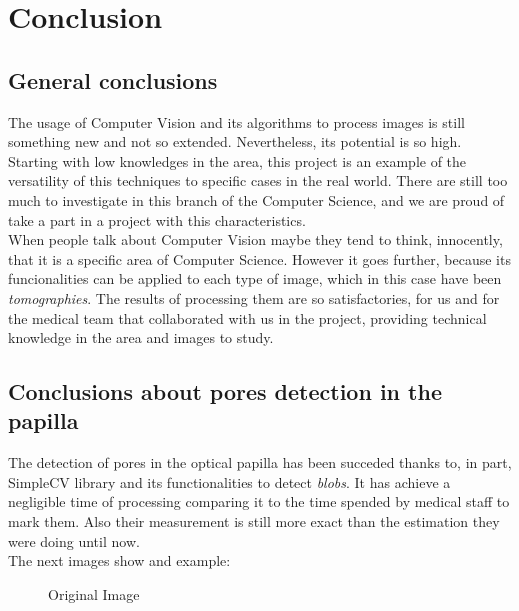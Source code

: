 \chapter{Conclusion}
\section{General conclusions}
The usage of Computer Vision and its algorithms to process images is
still something new and not so extended. Nevertheless, its potential is
so high. Starting with low knowledges in the area, this project is an
example of the versatility of this techniques to specific cases in
the real world. There are still too much to investigate in this branch
of the Computer Science, and we are proud of take a part in a project
with this characteristics.\\
When people talk about Computer Vision maybe they tend to think,
innocently, that it is a specific area of Computer Science. However
it goes further, because its funcionalities can be applied to each
type of image, which in this case have been \emph{tomographies}.
The results of processing them are so satisfactories, for us and
for the medical team that collaborated with us in the project, 
providing technical knowledge in the area and images to study.

\section{Conclusions about pores detection in the papilla}
The detection of pores in the optical papilla has been succeded thanks
to, in part, SimpleCV library and its functionalities to detect 
\emph{blobs}. It has achieve a negligible time of processing comparing
it to the time spended by medical staff to mark them. Also their 
measurement is still more exact than the estimation they were doing
until now. \\
The next images show and example:

    \begin{figure}[H]
      \caption{Original Image}
      \centering \setlength\fboxsep{0pt} \setlength\fboxrule{0.5pt}
    \end{figure}

